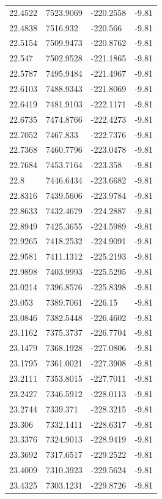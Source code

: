 \begin{table}[H]
\begin{tabular}{llll}
22.4522 & 7523.9069 & -220.2558 & -9.81 \\
22.4838 & 7516.932 & -220.566 & -9.81 \\
22.5154 & 7509.9473 & -220.8762 & -9.81 \\
22.547 & 7502.9528 & -221.1865 & -9.81 \\
22.5787 & 7495.9484 & -221.4967 & -9.81 \\
22.6103 & 7488.9343 & -221.8069 & -9.81 \\
22.6419 & 7481.9103 & -222.1171 & -9.81 \\
22.6735 & 7474.8766 & -222.4273 & -9.81 \\
22.7052 & 7467.833 & -222.7376 & -9.81 \\
22.7368 & 7460.7796 & -223.0478 & -9.81 \\
22.7684 & 7453.7164 & -223.358 & -9.81 \\
22.8 & 7446.6434 & -223.6682 & -9.81 \\
22.8316 & 7439.5606 & -223.9784 & -9.81 \\
22.8633 & 7432.4679 & -224.2887 & -9.81 \\
22.8949 & 7425.3655 & -224.5989 & -9.81 \\
22.9265 & 7418.2532 & -224.9091 & -9.81 \\
22.9581 & 7411.1312 & -225.2193 & -9.81 \\
22.9898 & 7403.9993 & -225.5295 & -9.81 \\
23.0214 & 7396.8576 & -225.8398 & -9.81 \\
23.053 & 7389.7061 & -226.15 & -9.81 \\
23.0846 & 7382.5448 & -226.4602 & -9.81 \\
23.1162 & 7375.3737 & -226.7704 & -9.81 \\
23.1479 & 7368.1928 & -227.0806 & -9.81 \\
23.1795 & 7361.0021 & -227.3908 & -9.81 \\
23.2111 & 7353.8015 & -227.7011 & -9.81 \\
23.2427 & 7346.5912 & -228.0113 & -9.81 \\
23.2744 & 7339.371 & -228.3215 & -9.81 \\
23.306 & 7332.1411 & -228.6317 & -9.81 \\
23.3376 & 7324.9013 & -228.9419 & -9.81 \\
23.3692 & 7317.6517 & -229.2522 & -9.81 \\
23.4009 & 7310.3923 & -229.5624 & -9.81 \\
23.4325 & 7303.1231 & -229.8726 & -9.81 \\

\end{tabular}
\end{table}
